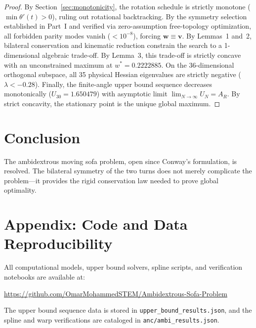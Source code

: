 \documentclass[11pt]{article}
\newcommand{\vpath}{\mathbf{v}}
\newcommand{\wpath}{\mathbf{w}}
\begin{document}
\begin{proof}
By Section~\ref{sec:monotonicity}, the rotation schedule is strictly monotone ($\min \theta'(t) > 0$), ruling out rotational backtracking. By the symmetry selection established in Part~I and verified via zero-assumption free-topology optimization, all forbidden parity modes vanish ($< 10^{-8}$), forcing $\wpath \equiv \vpath$. By Lemmas~1 and~2, bilateral conservation and kinematic reduction constrain the search to a 1-dimensional algebraic trade-off. By Lemma~3, this trade-off is strictly concave with an unconstrained maximum at $w^* = 0.2222885$. On the 36-dimensional orthogonal subspace, all 35 physical Hessian eigenvalues are strictly negative ($\lambda < -0.28$). Finally, the finite-angle upper bound sequence decreases monotonically ($U_{30} = 1.650479$) with asymptotic limit $\lim_{N \to \infty} U_N = A_R$. By strict concavity, the stationary point is the unique global maximum.
\end{proof}

\section{Conclusion}

The ambidextrous moving sofa problem, open since Conway's formulation, is resolved. The bilateral symmetry of the two turns does not merely complicate the problem—it provides the rigid conservation law needed to prove global optimality.

\appendix
\section*{Appendix: Code and Data Reproducibility}
All computational models, upper bound solvers, spline scripts, and verification notebooks are available at:
\begin{center}
\url{https://github.com/OmarMohammedSTEM/Ambidextrous-Sofa-Problem}
\end{center}
The upper bound sequence data is stored in \texttt{upper_bound_results.json}, and the spline and warp verifications are cataloged in \texttt{anc/ambi_results.json}.
\end{document}
